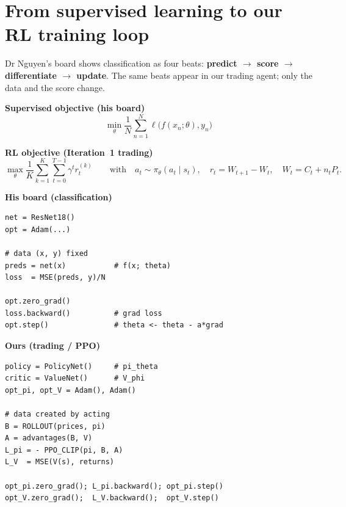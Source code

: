 \documentclass[10pt,a4paper]{article}
\begin{document}
\section*{From supervised learning to our RL training loop}
\noindent\small
Dr Nguyen's board shows classification as four beats:
\textbf{predict $\rightarrow$ score $\rightarrow$ differentiate $\rightarrow$ update}.
The same beats appear in our trading agent; only the data and the score change.

\vspace{0.55em}
\noindent\textbf{Supervised objective (his board)}
\[
\min_{\theta}\frac{1}{N}\sum_{n=1}^{N}\ell\bigl(f(x_n;\theta),y_n\bigr)
\]

\noindent\textbf{RL objective (Iteration~1 trading)}
\[
\max_{\theta}\frac{1}{K}\sum_{k=1}^{K}\sum_{t=0}^{T-1}\gamma^{t}r_t^{(k)}
\qquad\text{with}\quad
a_t\sim\pi_\theta(a_t\mid s_t),\quad
r_t=W_{t+1}-W_t,\quad
W_t=C_t+n_tP_t.
\]

\vspace{0.35em}
\noindent
\begin{minipage}[t]{0.48\textwidth}
\centering\textbf{His board (classification)}\par\vspace{0.3em}
\begin{Verbatim}[fontsize=\scriptsize,frame=single,framesep=4pt]
net = ResNet18()
opt = Adam(...)

# data (x, y) fixed
preds = net(x)           # f(x; theta)
loss  = MSE(preds, y)/N

opt.zero_grad()
loss.backward()          # grad loss
opt.step()               # theta <- theta - a*grad
\end{Verbatim}
\end{minipage}\hfill
\begin{minipage}[t]{0.48\textwidth}
\centering\textbf{Ours (trading / PPO)}\par\vspace{0.3em}
\begin{Verbatim}[fontsize=\scriptsize,frame=single,framesep=4pt]
policy = PolicyNet()     # pi_theta
critic = ValueNet()      # V_phi
opt_pi, opt_V = Adam(), Adam()

# data created by acting
B = ROLLOUT(prices, pi)
A = advantages(B, V)
L_pi = - PPO_CLIP(pi, B, A)
L_V  = MSE(V(s), returns)

opt_pi.zero_grad(); L_pi.backward(); opt_pi.step()
opt_V.zero_grad();  L_V.backward();  opt_V.step()
\end{Verbatim}
\end{minipage}
\end{document}
